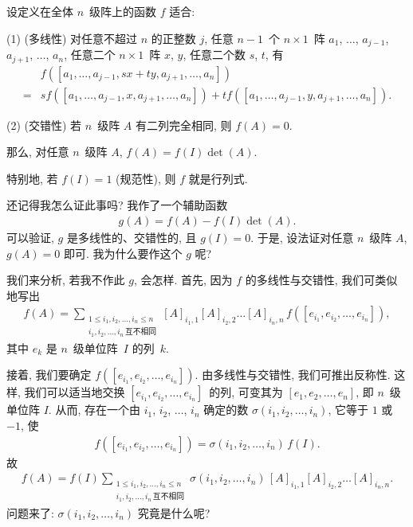 \documentclass[%
    UTF8,%
    fontset=none,%
    punct=kaiming,%
    zihao=-4,%
    a4paper,%
    oneside,%
]{ctexbook}
\renewcommand*{\leq}{\leqslant}
\begin{document}
\begin{theorem}
    设定义在全体 \(n\)~级阵上的函数 \(f\) 适合:

    (1)
    (多线性)
    对任意不超过 \(n\) 的正整数 \(j\),
    任意 \(n-1\)~个 \(n \times 1\)~阵
    \(a_1\), \(\dots\), \(a_{j-1}\),
    \(a_{j+1}\), \(\dots\), \(a_n\),
    任意二个 \(n \times 1\)~阵 \(x\), \(y\),
    任意二个数 \(s\), \(t\),
    有
    \begin{align*}
             & f
            {([a_1, \dots, a_{j-1}, sx + ty,
                        a_{j+1}, \dots, a_n])}
        \\
        = {} &
        s
        f {([a_1, \dots, a_{j-1}, x, a_{j+1}, \dots, a_n])}
        +
        t
        f {([a_1, \dots, a_{j-1}, y, a_{j+1}, \dots, a_n])}.
    \end{align*}

    (2)
    (交错性)
    若 \(n\)~级阵 \(A\) 有二列完全相同,
    则 \(f {(A)} = 0\).

    那么, 对任意 \(n\)~级阵 \(A\),
    \(f(A) = f(I) \det {(A)}\).

    特别地, 若 \(f(I) = 1\) (规范性),
    则 \(f\) 就是行列式.
\end{theorem}

还记得我怎么证此事吗?
我作了一个辅助函数
\begin{align*}
    g(A) = f(A) - f(I) \det {(A)}.
\end{align*}
可以验证, \(g\) 是多线性的、交错性的,
且 \(g(I) = 0\).
于是, 设法证对任意 \(n\)~级阵 \(A\),
\(g(A) = 0\) 即可.
我为什么要作这个 \(g\) 呢?

我们来分析, 若我不作此 \(g\), 会怎样.
首先, 因为 \(f\) 的多线性与交错性,
我们可类似地写出
\begin{align*}
    f(A)
    = \sum_{\substack{
    1 \leq i_1, i_2, \dots, i_n \leq n \\
            i_1, i_2, \dots, i_n\,\text{互不相同}
        }}
    {[A]_{i_1,1} [A]_{i_2,2} \dots [A]_{i_n,n}\,
        f([e_{i_1}, e_{i_2}, \dots, e_{i_n}])},
\end{align*}
其中 \(e_k\) 是 \(n\)~级单位阵~\(I\) 的列~\(k\).

接着, 我们要确定
\(f([e_{i_1}, e_{i_2}, \dots, e_{i_n}])\).
由多线性与交错性, 我们可推出反称性.
这样, 我们可以适当地交换
\([e_{i_1}, e_{i_2}, \dots, e_{i_n}]\)~的列,
可变其为 \([e_1, e_2, \dots, e_n]\),
即 \(n\)~级单位阵 \(I\).
从而, 存在一个由 \(i_1\), \(i_2\), \(\dots\), \(i_n\)
确定的数 \(\sigma (i_1, i_2, \dots, i_n)\),
它等于 \(1\) 或 \(-1\),
使
\begin{align*}
    f([e_{i_1}, e_{i_2}, \dots, e_{i_n}])
    = \sigma (i_1, i_2, \dots, i_n)\, f(I).
\end{align*}
故
\begin{align*}
    f(A)
    = f(I) \sum_{\substack{
    1 \leq i_1, i_2, \dots, i_n \leq n \\
            i_1, i_2, \dots, i_n\,\text{互不相同}
        }}
    {\sigma (i_1, i_2, \dots, i_n)\,
        [A]_{i_1,1} [A]_{i_2,2} \dots [A]_{i_n,n}}.
\end{align*}
问题来了: \(\sigma (i_1, i_2, \dots, i_n)\)
究竟是什么呢?
\end{document}
